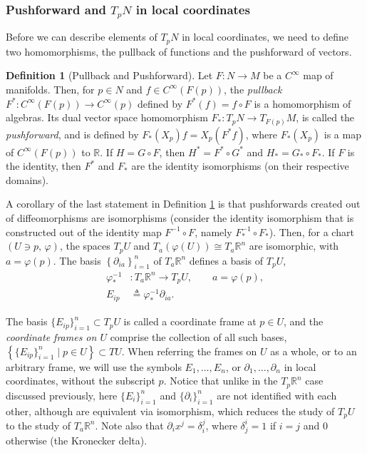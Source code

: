 \documentclass[psamsfonts]{amsart}
\theoremstyle{definition}
\newtheorem{defn}[thm]{Definition}
\theoremstyle{remark}
\newcommand*\R{\mathds{R}}
\numberwithin{equation}{section}
\begin{document}
\subsubsection{Pushforward and $T_pN$ in local coordinates}
Before we can describe elements of $T_pN$ in local coordinates, we need to define two homomorphisms, the pullback of functions and the pushforward of vectors. 

\begin{defn}[Pullback and Pushforward]\label{def:pushforward}
Let $F:N\rightarrow M$ be a $C^{\infty}$ map of manifolds. Then, for $p\in N$ and $f\in C^{\infty}(F(p))$, the \textit{pullback} $F^*:C^{\infty}(F(p))\rightarrow C^{\infty}(p)$ defined by $F^*(f) = f\circ F$ is a homomorphism of algebras. Its dual vector space homomorphism $F_*:T_pN \rightarrow T_{F(p)}M$, is called the \textit{pushforward}, and is defined by $F_*(X_p)f = X_p(F^*f)$, where $F_*(X_p)$ is a map of $C^{\infty}(F(p))$ to $\R$. If $H = G\circ F$, then $H^* = F^* \circ G^*$ and $H_* = G_* \circ F_*$. If $F$ is the identity, then $F^*$ and $F_*$ are the identity isomorphisms (on their respective domains). 
\end{defn}

A corollary of the last statement in Definition \ref{def:pushforward} is that pushforwards created out of diffeomorphisms are isomorphisms (consider the identity isomorphism that is constructed out of the identity map $F^{-1}\circ F$, namely $F_*^{-1}\circ F_*$). Then, for a chart $(U\ni p,\, \varphi)$, the spaces $T_pU$ and $T_{a}\left(\varphi(U)\right) \cong T_{a}\R^n$ are isomorphic, with $a = \varphi(p)$. The basis $ \left\{\partial_{ia}\right\}_{i = 1}^n$ of $T_{a}\R^n$ defines a basis of $T_pU$, 
\begin{equation}
\begin{aligned}
\varphi^{-1}_*&:T_{a}\R^n\rightarrow T_pU, \qquad a = \varphi(p),\\
E_{ip} &\triangleq{} \varphi^{-1}_*\partial_{ia}.
\end{aligned}
\end{equation}


The basis $\{E_{ip}\}_{i=1}^n \subset T_pU$ is called a {coordinate frame} at $p\in U$, and the \textit{coordinate frames on $U$} comprise the collection of all such bases, $\left\{ \{E_{ip}\}_{i=1}^n \; \bigr| \;p\in U \right\} \subset TU$. When referring the frames on $U$ as a whole, or to an arbitrary frame, we will use the symbols $E_1, \dots, E_n$, or $\partial_1, \dots, \partial_n$ in local coordinates, without the subscript $p$. Notice that unlike in the $T_p\R^n$ case discussed previously, here $\{E_{i}\}_{i = 1}^n$ and $\{\partial_{i}\}_{i = 1}^n$ are not {identified} with each other, although are equivalent via isomorphism, which reduces the study of $T_pU$ to the study of $T_{a}\R^n$. Note also that $\partial_i x^j = \delta_{i}^j$, where $\delta^i_j = 1$ if $i=j$ and $0$ otherwise (the Kronecker delta). 
\end{document}
